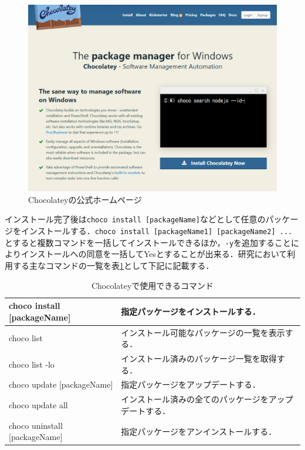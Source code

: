 \begin{figure}[htb]
\centering
\includegraphics[width=12cm]{images/chocolatey.png}
\caption{Chocolateyの公式ホームページ}\label{chocolatey}
\end{figure}

\newpage

インストール完了後は\texttt{choco install [packageName]}などとして任意のパッケージをインストールする．\texttt{choco install [packageName1] [packageName2] ...}とすると複数コマンドを一括してインストールできるほか，\texttt{-y}を追加することによりインストールへの同意を一括してYesとすることが出来る．研究において利用する主なコマンドの一覧を表\ref{table:Chocolatey}として下記に記載する．

\begin{table}[htb]
\caption{Chocolateyで使用できるコマンド}
\label{table:Chocolatey}
\begin{tabular}{|p{5cm}|p{7.5cm}|} \hline
choco install [packageName] & 指定パッケージをインストールする．\\ \hline
choco list & インストール可能なパッケージの一覧を表示する．\\ \hline
choco list -lo & インストール済みのパッケージ一覧を取得する．\\ \hline
choco update [packageName] & 指定パッケージをアップデートする．\\ \hline
choco update all & インストール済みの全てのパッケージをアップデートする．\\ \hline
choco uninstall [packageName] & 指定パッケージをアンインストールする．\\ \hline
\end{tabular}
\end{table}

